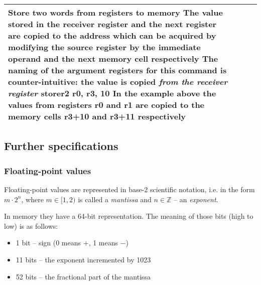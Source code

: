 \documentclass{article}
\newcommand{\St}[1]{{\fontfamily{qcr}\selectfont #1}}
\begin{document}
{\begin{table*}[h!]
\begin{tabular}{| >{\centering\arraybackslash} m{1cm} | >{\centering\arraybackslash} m{1.4cm} | >{\centering\arraybackslash} m{1.2cm} | m{11.6cm} |}
 Store two words from registers to memory \newline
 The value stored in the receiver register and the next register are copied to \newline
 the address which can be acquired by modifying the source register by \newline
 the immediate operand and the next memory cell respectively \newline
 The naming of the argument registers for this command is counter-intuitive: \newline
 the value is copied \textit{from the receiver register} \newline
 \St{storer2 r0, r3, 10} \newline
 In the example above the values from registers \St{r0} and \St{r1} are copied to \newline
 the memory cells \St{r3+10} and \St{r3+11} respectively \\
 
 \hline

\end{tabular}
\end{table*}
}

\newpage

\subsection{Further specifications}

\hypertarget{float:storage}{}
\subsubsection{Floating-point values}

Floating-point values are represented in base-2 scientific notation, i.e. in the form $m\cdot 2^n$, \newline
where $m\in [1, 2)$ is called a \textit{mantissa} and $n\in \mathbb{Z}$ -- an \textit{exponent}.

In memory they have a 64-bit representation. The meaning of those bits (high to low) is as follows:

\begin{itemize}
	\item 1 bit -- sign (0 means $+$, 1 means $-$)
	\item 11 bits -- the exponent incremented by 1023
	\item 52 bits -- the fractional part of the mantissa
\end{itemize}
\end{document}
